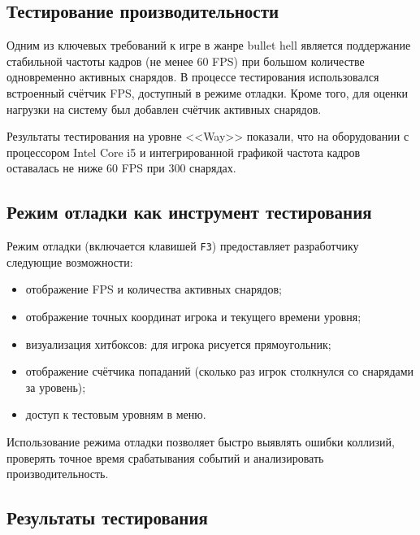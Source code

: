 \documentclass[../main.tex]{subfiles}
\begin{document}
\subsection{Тестирование производительности}

Одним из ключевых требований к игре в жанре bullet hell является поддержание стабильной частоты кадров (не менее 60 FPS) при большом количестве одновременно активных снарядов. В процессе тестирования использовался встроенный счётчик FPS, доступный в режиме отладки. Кроме того, для оценки нагрузки на систему был добавлен счётчик активных снарядов.

Результаты тестирования на уровне <<Way>> показали, что на оборудовании с процессором Intel Core i5 и интегрированной графикой частота кадров оставалась не ниже 60 FPS при 300 снарядах.

\subsection{Режим отладки как инструмент тестирования}

Режим отладки (включается клавишей \texttt{F3}) предоставляет разработчику следующие возможности:
\begin{itemize}
	\item отображение FPS и количества активных снарядов;
	\item отображение точных координат игрока и текущего времени уровня;
	\item визуализация хитбоксов: для игрока рисуется прямоугольник;
	\item отображение счётчика попаданий (сколько раз игрок столкнулся со снарядами за уровень);
	\item доступ к тестовым уровням в меню.
\end{itemize}

Использование режима отладки позволяет быстро выявлять ошибки коллизий, проверять точное время срабатывания событий и анализировать производительность.

\subsection{Результаты тестирования}
\end{document}
